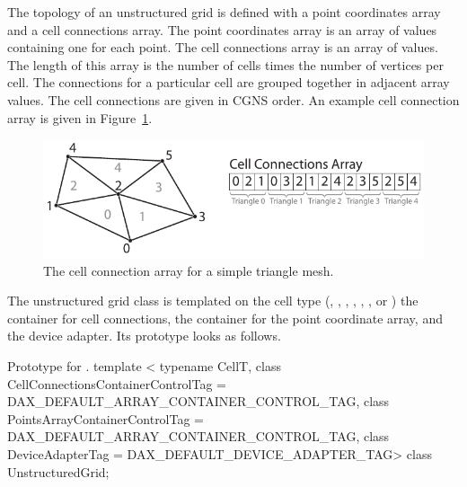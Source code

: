 The topology of an unstructured grid is defined with a point coordinates
array and a cell connections array. The point coordinates array is an array
of  values containing one for each point. The cell connections
array is an array of  values. The length of this array is the
number of cells times the number of vertices per cell. The connections for
a particular cell are grouped together in adjacent array values. The cell
connections are given in CGNS order. An example cell connection
array is given in Figure~\ref{fig:CellConnections}.

\begin{figure}[htb]
  \centering
  \includegraphics{images/CellConnections}
  \caption{The cell connection array for a simple triangle mesh.}
  \label{fig:CellConnections}
\end{figure}

The unstructured grid class is templated on the cell type
(, , ,
, , , or
) the container for cell connections, the container for
the point coordinate array, and the device adapter. Its prototype looks as
follows.

\begin{daxexample}{Prototype for \protect{}.}
template <
    typename CellT,
    class CellConnectionsContainerControlTag = DAX_DEFAULT_ARRAY_CONTAINER_CONTROL_TAG,
    class PointsArrayContainerControlTag = DAX_DEFAULT_ARRAY_CONTAINER_CONTROL_TAG,
    class DeviceAdapterTag = DAX_DEFAULT_DEVICE_ADAPTER_TAG>
class UnstructuredGrid;
\end{daxexample}

